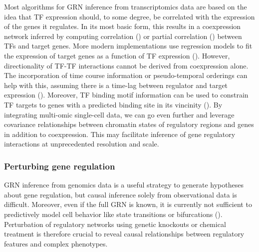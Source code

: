 Most algorithms for GRN inference from transcriptomics data are based on the idea that TF expression should, to some degree, be correlated with the expression of the genes it regulates. In its most basic form, this results in a coexpression network inferred by computing correlation (\cite{stuart_gene-coexpression_2003}) or partial correlation (\cite{kim_ppcor_2015}) between TFs and target genes. More modern implementations use regression models to fit the expression of target genes as a function of TF expression (\cite{aibar_scenic_2017}). However, directionality of TF-TF interactions cannot be derived from coexpression alone. The incorporation of time course information or pseudo-temporal orderings can help with this, assuming there is a time-lag between regulator and target expression (\cite{qiu_inferring_2020}). Moreover, TF binding motif information can be used to constrain TF targets to genes with a predicted binding site in its vincinity (\cite{aibar_scenic_2017}). By integrating multi-omic single-cell data, we can go even further and leverage covariance relationships between chromatin states of regulatory regions and genes in addition to coexpression. This may facilitate inference of gene regulatory interactions at unprecedented resolution and scale.


\subsubsection{Perturbing gene regulation}

GRN inference from genomics data is a useful strategy to generate hypotheses about gene regulation, but causal inference solely from observational data is difficult. Moreover, even if the full GRN is known, it is currently not sufficient to predictively model cell behavior like state transitions or bifurcations (\cite{teschendorff_statistical_2021}). Perturbation of regulatory networks using genetic knockouts or chemical treatment is therefore crucial to reveal causal relationships between regulatory features and complex phenotypes.

